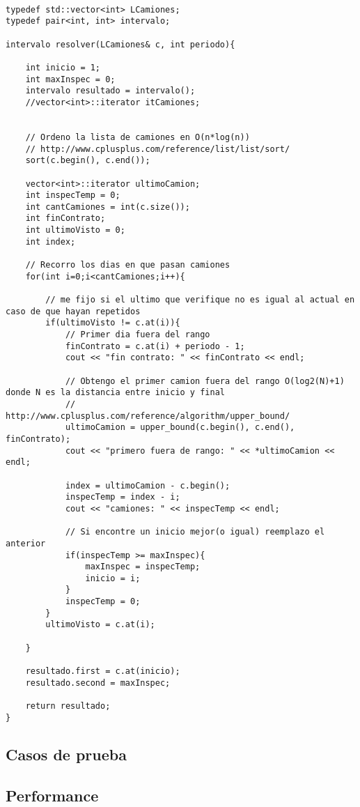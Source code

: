\begin{lstlisting}

typedef std::vector<int> LCamiones;
typedef pair<int, int> intervalo;

intervalo resolver(LCamiones& c, int periodo){
	
	int inicio = 1;
	int maxInspec = 0;
	intervalo resultado = intervalo();
	//vector<int>::iterator itCamiones;


	// Ordeno la lista de camiones en O(n*log(n))
	// http://www.cplusplus.com/reference/list/list/sort/
	sort(c.begin(), c.end());

	vector<int>::iterator ultimoCamion;
	int inspecTemp = 0;
	int cantCamiones = int(c.size());
	int finContrato;
	int ultimoVisto = 0;
	int index;

	// Recorro los dias en que pasan camiones
	for(int i=0;i<cantCamiones;i++){
		
		// me fijo si el ultimo que verifique no es igual al actual en caso de que hayan repetidos
		if(ultimoVisto != c.at(i)){
			// Primer dia fuera del rango
			finContrato = c.at(i) + periodo - 1;
			cout << "fin contrato: " << finContrato << endl;
			
			// Obtengo el primer camion fuera del rango O(log2(N)+1) donde N es la distancia entre inicio y final
			// http://www.cplusplus.com/reference/algorithm/upper_bound/
			ultimoCamion = upper_bound(c.begin(), c.end(), finContrato);
			cout << "primero fuera de rango: " << *ultimoCamion << endl;
			
			index = ultimoCamion - c.begin();
			inspecTemp = index - i;
			cout << "camiones: " << inspecTemp << endl;

			// Si encontre un inicio mejor(o igual) reemplazo el anterior
			if(inspecTemp >= maxInspec){
				maxInspec = inspecTemp;
				inicio = i;
			}
			inspecTemp = 0;
		}
		ultimoVisto = c.at(i);

	}

	resultado.first = c.at(inicio);
	resultado.second = maxInspec;
	
	return resultado;
}

\end{lstlisting}

\subsection{Casos de prueba}

\subsection{Performance}

